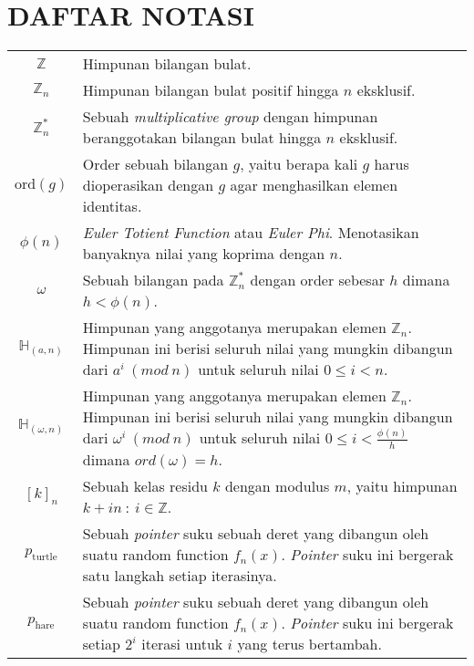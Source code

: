 \chapter{DAFTAR NOTASI}
\begin{tabularx}{\linewidth}{c X}
	$ \mathbb{Z} $ & Himpunan bilangan bulat. \\
	$ \mathbb{Z}_n $ & Himpunan bilangan bulat positif hingga $ n $ eksklusif. \\
	$ \mathbb{Z}_n^* $ & Sebuah \textit{multiplicative group} dengan himpunan beranggotakan bilangan bulat hingga $ n $ eksklusif. \\
	$ \text{ord}(g) $ & Order sebuah bilangan $ g $, yaitu berapa kali $ g $ harus dioperasikan dengan $ g $ agar menghasilkan elemen identitas. \\
	$ \phi(n) $ & \textit{Euler Totient Function} atau \textit{Euler Phi}. Menotasikan banyaknya nilai yang koprima dengan $ n $. \\
	$ \omega $ & Sebuah bilangan pada $ \mathbb{Z}_n^* $ dengan order sebesar $ h $ dimana $ h < \phi(n) $. \\	
	$ \mathbb{H}_{(a, n)} $ & Himpunan yang anggotanya merupakan elemen $ \mathbb{Z}_n $. Himpunan ini berisi seluruh nilai yang mungkin dibangun dari $ a^i\ (mod\ n) $ untuk seluruh nilai $ 0 \leq i < n $. \\
	$ \mathbb{H}_{(\omega, n)} $ & Himpunan yang anggotanya merupakan elemen $ \mathbb{Z}_n $. Himpunan ini berisi seluruh nilai yang mungkin dibangun dari $ \omega^i\ (mod\ n) $ untuk seluruh nilai $ 0 \leq i < \frac{\phi(n)}{h} $ dimana $ ord(\omega) = h $. \\
	$ [k]_n $ & Sebuah kelas residu $ k $ dengan modulus $ m $, yaitu himpunan $ {k + in\ :\ i \in \mathbb{Z}} $. \\
	$ p_{\text{turtle}} $ & Sebuah \textit{pointer} suku sebuah deret yang dibangun oleh suatu random function $ f_n(x) $. \textit{Pointer} suku ini bergerak satu langkah setiap iterasinya. \\
	$ p_{\text{hare}} $ & Sebuah \textit{pointer} suku sebuah deret yang dibangun oleh suatu random function $ f_n(x) $. \textit{Pointer} suku ini bergerak setiap $ 2^i $ iterasi untuk $ i $ yang terus bertambah.
\end{tabularx}